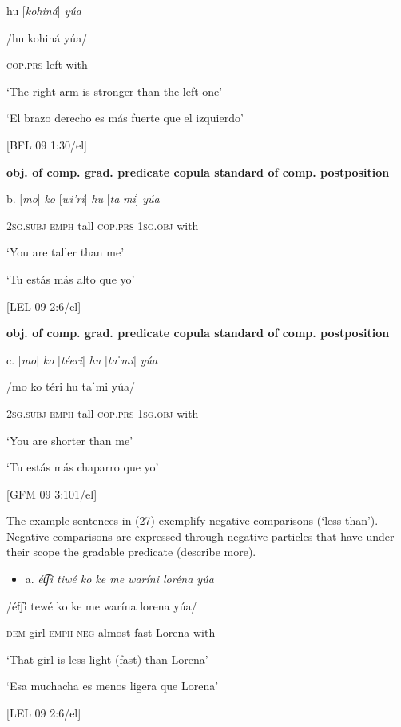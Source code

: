   hu  [\textit{kohiná}]   \textit{yúa}

  /hu   kohiná      yúa/

  \textsc{cop.prs}  left        with

  ‘The right arm is stronger than the left one’

  ‘El brazo derecho es más fuerte que el izquierdo’

  [BFL 09 1:30/el]

 \textbf{obj. of comp.    grad. predicate  copula  standard of comp.  postposition}

 b.   [\textit{mo}] \textit{ko} [\textit{wi’rí}] \textit{hu} [\textit{taˈmi}] \textit{yúa}

\textsc{2sg.subj  emph} tall      \textsc{cop.prs  1sg.obj} with

‘You are taller than me’

‘Tu estás más alto que yo’

[LEL 09 2:6/el]

  \textbf{obj. of comp.    grad. predicate  copula  standard of comp.  postposition}

  c.  [\textit{mo}] \textit{ko} [\textit{téeri}] \textit{hu} [\textit{taˈmi}] \textit{yúa}

 /mo    ko    téri      hu    taˈmi        yúa/

\textsc{2sg.subj  emph} tall      \textsc{cop.prs  1sg.obj} with

‘You are shorter than me’

‘Tu estás más chaparro que yo’

[GFM 09 3:101/el]

  The example sentences in (27) exemplify negative comparisons (‘less than’). Negative comparisons are expressed through negative particles that have under their scope the gradable predicate (describe more). 

\begin{itemize}
\item a.   \textit{ét͡ʃi    tiwé  ko  ke  me    waríni  loréna  yúa}
\end{itemize}

/ét͡ʃi  tewé  ko  ke  me    warína  lorena  yúa/

\textsc{dem} girl  \textsc{emph  neg} almost  fast    Lorena  with

‘That girl is less light (fast) than Lorena’

‘Esa muchacha es menos ligera que Lorena’

[LEL 09 2:6/el]

